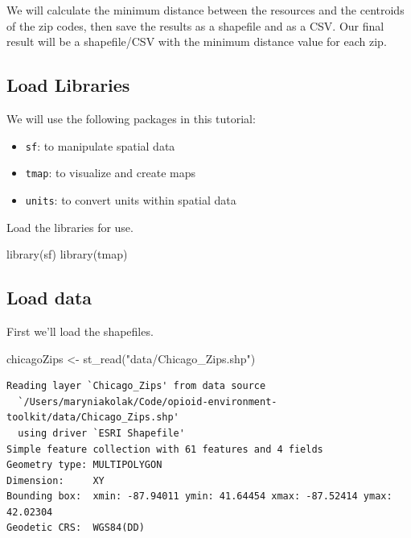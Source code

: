 \documentclass[
  letterpaper,
  DIV=11,
  numbers=noendperiod]{scrreprt}
\newenvironment{Shaded}{\begin{snugshade}}{\end{snugshade}}
\newcommand{\FunctionTok}[1]{\textcolor[rgb]{0.28,0.35,0.67}{#1}}
\newcommand{\NormalTok}[1]{\textcolor[rgb]{0.00,0.23,0.31}{#1}}
\newcommand{\OtherTok}[1]{\textcolor[rgb]{0.00,0.23,0.31}{#1}}
\newcommand{\StringTok}[1]{\textcolor[rgb]{0.13,0.47,0.30}{#1}}
\providecommand{\tightlist}{%
  \setlength{\itemsep}{0pt}\setlength{\parskip}{0pt}}
\begin{document}
We will calculate the minimum distance between the resources and the
centroids of the zip codes, then save the results as a shapefile and as
a CSV. Our final result will be a shapefile/CSV with the minimum
distance value for each zip.

\subsection{Load Libraries}\label{load-libraries-1}

We will use the following packages in this tutorial:

\begin{itemize}
\tightlist
\item
  \texttt{sf}: to manipulate spatial data
\item
  \texttt{tmap}: to visualize and create maps
\item
  \texttt{units}: to convert units within spatial data
\end{itemize}

Load the libraries for use.

\begin{Shaded}
\begin{Highlighting}[]
\FunctionTok{library}\NormalTok{(sf)}
\FunctionTok{library}\NormalTok{(tmap)}
\end{Highlighting}
\end{Shaded}

\subsection{Load data}\label{load-data-2}

First we'll load the shapefiles.

\begin{Shaded}
\begin{Highlighting}[]
\NormalTok{chicagoZips }\OtherTok{\textless{}{-}} \FunctionTok{st\_read}\NormalTok{(}\StringTok{"data/Chicago\_Zips.shp"}\NormalTok{)}
\end{Highlighting}
\end{Shaded}

\begin{verbatim}
Reading layer `Chicago_Zips' from data source 
  `/Users/maryniakolak/Code/opioid-environment-toolkit/data/Chicago_Zips.shp' 
  using driver `ESRI Shapefile'
Simple feature collection with 61 features and 4 fields
Geometry type: MULTIPOLYGON
Dimension:     XY
Bounding box:  xmin: -87.94011 ymin: 41.64454 xmax: -87.52414 ymax: 42.02304
Geodetic CRS:  WGS84(DD)
\end{verbatim}
\end{document}
